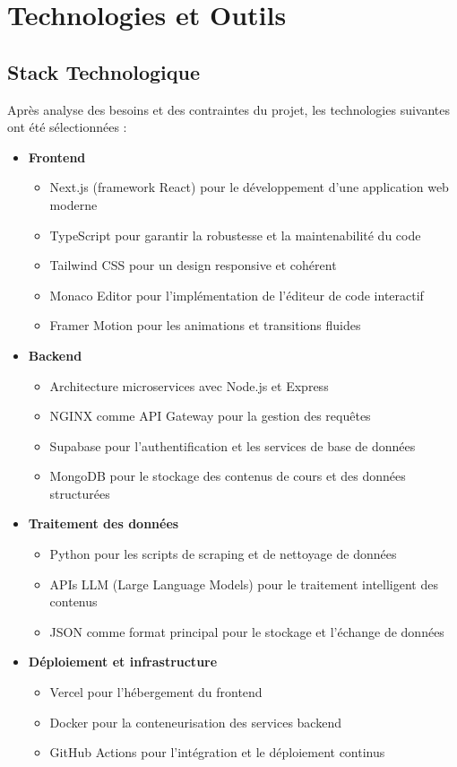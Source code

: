 \section{Technologies et Outils}

\subsection{Stack Technologique}
Après analyse des besoins et des contraintes du projet, les technologies suivantes ont été sélectionnées :

\begin{itemize}
  \item \textbf{Frontend}
    \begin{itemize}
      \item Next.js (framework React) pour le développement d'une application web moderne
      \item TypeScript pour garantir la robustesse et la maintenabilité du code
      \item Tailwind CSS pour un design responsive et cohérent
      \item Monaco Editor pour l'implémentation de l'éditeur de code interactif
      \item Framer Motion pour les animations et transitions fluides
    \end{itemize}
  
  \item \textbf{Backend}
    \begin{itemize}
      \item Architecture microservices avec Node.js et Express
      \item NGINX comme API Gateway pour la gestion des requêtes
      \item Supabase pour l'authentification et les services de base de données
      \item MongoDB pour le stockage des contenus de cours et des données structurées
    \end{itemize}
  
  \item \textbf{Traitement des données}
    \begin{itemize}
      \item Python pour les scripts de scraping et de nettoyage de données
      \item APIs LLM (Large Language Models) pour le traitement intelligent des contenus
      \item JSON comme format principal pour le stockage et l'échange de données
    \end{itemize}
  
  \item \textbf{Déploiement et infrastructure}
    \begin{itemize}
      \item Vercel pour l'hébergement du frontend
      \item Docker pour la conteneurisation des services backend
      \item GitHub Actions pour l'intégration et le déploiement continus
    \end{itemize}
\end{itemize}

